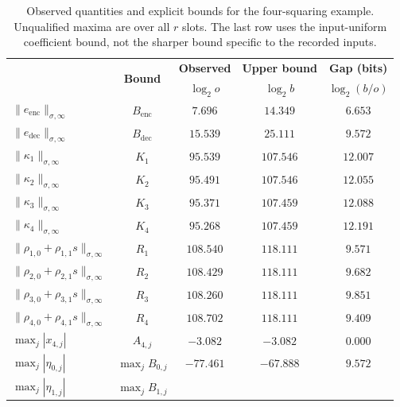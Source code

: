 \begin{table}[H]
\centering
\begin{minipage}{0.90\linewidth}
\centering
\setlength{\belowcaptionskip}{6pt}
\caption{Observed quantities and explicit bounds for the four-squaring
example. Unqualified maxima are over all $r$ slots. The last row uses
the input-uniform coefficient bound, not the sharper bound specific
to the recorded inputs.}
\label{tab:example-error-bounds}
\small
\setlength{\tabcolsep}{6pt}
\renewcommand{\arraystretch}{1.12}
\begin{tabularx}{\linewidth}{>{\centering\arraybackslash}Xcccc}
\toprule
\multirow{2}{*}{\textbf{Quantity}}
 & \multirow{2}{*}{\textbf{Bound}}
 & \textbf{Observed} & \textbf{Upper bound} & \textbf{Gap (bits)}\\
 & & $\log_2o$ & $\log_2b$ & $\log_2(b/o)$\\
\midrule
\rowcolor{black!5}
$\|e_{\mathrm{enc}}\|_{\sigma,\infty}$ & $B_{\mathrm{enc}}$
 & $7.696$ & $14.349$ & $6.653$\\
$\|e_{\mathrm{dec}}\|_{\sigma,\infty}$ & $B_{\mathrm{dec}}$
 & $15.539$ & $25.111$ & $9.572$\\
\rowcolor{black!5}
$\|\kappa_1\|_{\sigma,\infty}$ & $K_1$
 & $95.539$ & $107.546$ & $12.007$\\
$\|\kappa_2\|_{\sigma,\infty}$ & $K_2$
 & $95.491$ & $107.546$ & $12.055$\\
\rowcolor{black!5}
$\|\kappa_3\|_{\sigma,\infty}$ & $K_3$
 & $95.371$ & $107.459$ & $12.088$\\
$\|\kappa_4\|_{\sigma,\infty}$ & $K_4$
 & $95.268$ & $107.459$ & $12.191$\\
\rowcolor{black!5}
$\|\rho_{1,0}+\rho_{1,1}s\|_{\sigma,\infty}$ & $R_1$
 & $108.540$ & $118.111$ & $9.571$\\
$\|\rho_{2,0}+\rho_{2,1}s\|_{\sigma,\infty}$ & $R_2$
 & $108.429$ & $118.111$ & $9.682$\\
\rowcolor{black!5}
$\|\rho_{3,0}+\rho_{3,1}s\|_{\sigma,\infty}$ & $R_3$
 & $108.260$ & $118.111$ & $9.851$\\
$\|\rho_{4,0}+\rho_{4,1}s\|_{\sigma,\infty}$ & $R_4$
 & $108.702$ & $118.111$ & $9.409$\\
\midrule
\rowcolor{black!5}
$\max_j|x_{4,j}|$ & $A_{4,j}$
 & $-3.082$ & $-3.082$ & $0.000$\\
$\max_j|\eta_{0,j}|$ & $\max_jB_{0,j}$
 & $-77.461$ & $-67.888$ & $9.572$\\
\rowcolor{black!5}
$\max_j|\eta_{1,j}|$ & $\max_jB_{1,j}$

\end{tabularx}
\end{minipage}
\end{table}
